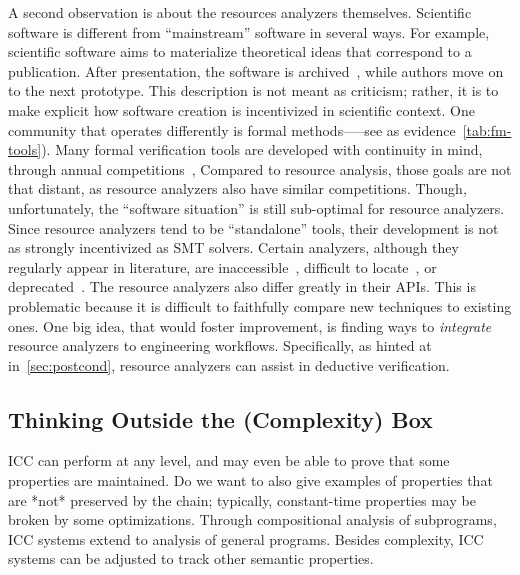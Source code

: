 A second observation is about the resources analyzers themselves.
Scientific software is different from \enquote{mainstream} software in several ways.
For example, scientific software aims to materialize theoretical ideas that correspond to a publication.
After presentation, the software is archived~\cite{acm_badging}, while authors move on to the next prototype.
This description is not meant as criticism;
rather, it is to make explicit how software creation is incentivized in scientific context.
One community that operates differently is formal methods—--see as evidence~\autoref{tab:fm-tools}). 
Many formal verification tools are developed with continuity in mind, through annual competitions~\cite{casc,beyer2022}, \etc 
Compared to resource analysis, those goals are not that distant, as resource analyzers also have similar competitions.
Though, unfortunately, the \enquote{software situation} is still sub-optimal for resource analyzers.
Since resource analyzers tend to be \enquote{standalone} tools, their development is not as strongly incentivized as \eg SMT solvers. 
Certain analyzers, although they regularly appear in literature, are inaccessible~\cite{sinn2017}, difficult to locate~\cite{carbonneaux2015},
or deprecated~\cite{gulwani2009,srikanth2017}.
The resource analyzers also differ greatly in their APIs.
This is problematic because it is difficult to faithfully compare new techniques to existing ones.
One big idea, that would foster improvement, is finding ways to \emph{integrate} resource analyzers to engineering workflows.
Specifically, as hinted at in~\autoref{sec:postcond}, resource analyzers can assist in deductive verification.

\subsection{Thinking Outside the (Complexity) Box}
\label{subsec:res-other-props}

ICC can perform at any level, and may even be able to prove that some properties are maintained.
Do we want to also give examples of properties that are *not* preserved by the chain;
typically, constant-time properties may be broken by some optimizations.
Through compositional analysis of subprograms, ICC systems extend to analysis of general programs.
Besides complexity, ICC systems can be adjusted to track other semantic properties.

